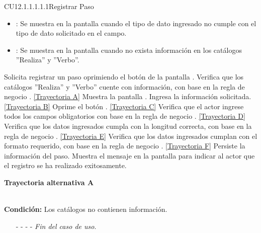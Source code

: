 \begin{UseCase}{CU12.1.1.1.1.1}{Registrar Paso}
{\begin{itemize}
		\item {}: Se muestra en la pantalla  cuando el tipo de dato ingresado no cumple con el tipo de dato solicitado en el campo.
		\item {}: Se muestra en la pantalla  cuando no exista información en los catálogos  ''Realiza'' y ''Verbo''.
		\end{itemize}}
	\end{UseCase}
	\begin{UCtrayectoria}
		\UCpaso[\UCactor] Solicita registrar un paso oprimiendo el botón  de la pantalla .
		\UCpaso[\UCsist] Verifica que los catálogos ''Realiza'' y ''Verbo'' cuente con información, con base en la regla de negocio . \hyperlink{CU12-1-1-1-1-1:TAA}{[Trayectoria A]}
		\UCpaso[\UCsist] Muestra la pantalla .
		\UCpaso[\UCactor] Ingresa la información solicitada. \hyperlink{CU12-1-1-1-1-1:TAB}{[Trayectoria B]} \label{CU12.1.1.1.1.1-P5}
		\UCpaso[\UCactor] Oprime el botón . \label{CU12.1.1.1.1.1-P6} \hyperlink{CU12-1-1-1-1-1:TAC}{[Trayectoria C]} 
		\UCpaso[\UCsist] Verifica que el actor ingrese todos los campos obligatorios con base en la regla de negocio . \hyperlink{CU12-1-1-1-1-1:TAD}{[Trayectoria D]}
		\UCpaso[\UCsist] Verifica que los datos ingresados cumpla con la longitud correcta, con base en la regla de negocio . \hyperlink{CU12-1-1-1-1-1:TAE}{[Trayectoria E]}
		\UCpaso[\UCsist] Verifica que los datos ingresados cumplan con el formato requerido, con base en la regla de negocio . \hyperlink{CU12-1-1-1-1-1:TAF}{[Trayectoria F]}
		\UCpaso[\UCsist] Persiste la información del paso.
		\UCpaso[\UCsist] Muestra el mensaje  en la pantalla  para indicar al actor que el registro se ha realizado exitosamente.
	\end{UCtrayectoria}		
\hypertarget{CU12-1-1-1-1-1:TAA}{\textbf{Trayectoria alternativa A}}\\
\noindent \textbf{Condición:} Los catálogos no contienen información.
\begin{enumerate}
	\UCpaso[\UCsist] Muestra el mensaje  en la pantalla  para indicar que no es posible realizar la operación debido a la falta de información necesaria para el sistema.
	\item[- -] - - {\em {Fin del caso de uso}}.%
\end{enumerate}

